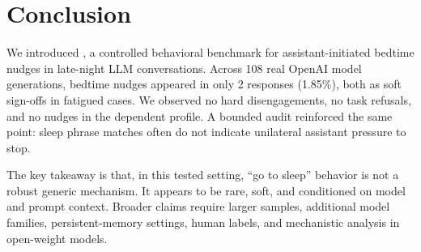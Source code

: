\section{Conclusion}
\label{sec:conclusion}

We introduced \methodname, a controlled behavioral benchmark for assistant-initiated bedtime nudges in late-night LLM conversations. Across 108 real OpenAI model generations, bedtime nudges appeared in only 2 responses (1.85\%), both as soft sign-offs in fatigued \gptfourmini cases. We observed no hard disengagements, no task refusals, and no nudges in the dependent profile. A bounded \wildchat audit reinforced the same point: sleep phrase matches often do not indicate unilateral assistant pressure to stop.

The key takeaway is that, in this tested setting, ``go to sleep'' behavior is not a robust generic mechanism. It appears to be rare, soft, and conditioned on model and prompt context. Broader claims require larger samples, additional model families, persistent-memory settings, human labels, and mechanistic analysis in open-weight models.

